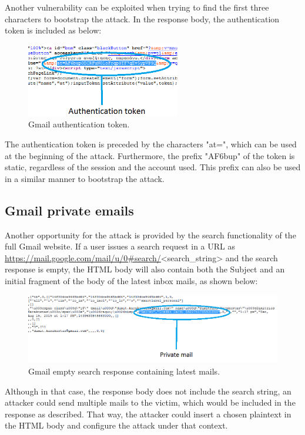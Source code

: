 Another vulnerability can be exploited when trying to find the first three
characters to bootstrap the attack. In the response body, the authentication
token is included as below:

\begin{figure}[H] \caption{Gmail authentication token.} \centering
\includegraphics[width=0.6\textwidth]{diagrams/gmail_bootstrap.png}\end{figure}

The authentication token is preceded by the characters "at=", which can be used
at the beginning of the attack. Furthermore, the prefix "AF6bup" of the token is
static, regardless of the session and the account used. This prefix can also be
used in a similar manner to bootstrap the attack.

\subsection{Gmail private emails}

Another opportunity for the attack is provided by the search functionality of
the full Gmail website. If a user issues a search request in a URL as
\url{https://mail.google.com/mail/u/0#search/}<search\_string> and the search
response is empty, the HTML body will also contain both the Subject and an
initial fragment of the body of the latest inbox mails, as shown below:

\begin{figure}[H] \caption{Gmail empty search response containing latest mails.}
\centering
\includegraphics[width=1.1\textwidth]{diagrams/gmail_plain_response.png}\end{figure}

Although in that case, the response body does not include the search string, an
attacker could send multiple mails to the victim, which would be included in the
response as described. That way, the attacker could insert a chosen plaintext in
the HTML body and configure the attack under that context.

